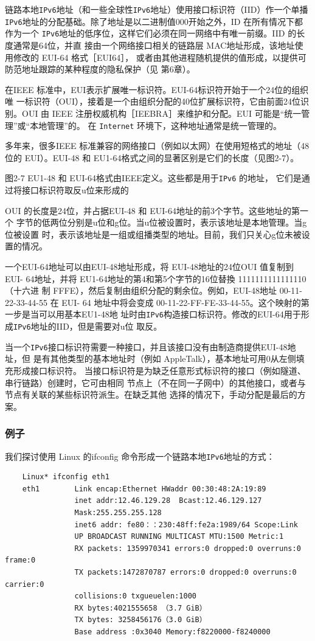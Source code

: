 链路本地\verb|IPv6|地址（和一些全球性\verb|IPv6|地址）使用接口标识符（IID）作一个单播
\verb|IPv6|地址的分配基础。除了地址是以二进制值000开始之外，ID 在所有情况下都作为一个
\verb|IPv6|地址的低序位，这样它们必须在同一网络中有唯一前缀。IID 的长度通常是64位，并直
接由一个网络接口相关的链路层 MAC地址形成，该地址使用修改的 EUI-64 格式［EUI64］，
或者由其他进程随机提供的值形成，以提供可防范地址跟踪的某种程度的隐私保护（见
第6章）。

在IEEE 标准中，EUI表示扩展唯一标识符。EUI-64标识符开始于一个24位的组织唯
一标识符（OUI），接着是一个由组织分配的40位扩展标识符，它由前面24位识别。OUI 由
IEEE 注册权威机构［IEEBRA］来维护和分配。EUI 可能是“统一管理”或“本地管理”的。
在 \verb|Internet| 环境下，这种地址通常是统一管理的。

多年来，很多IEEE 标准兼容的网络接口（例如以太网）在使用短格式的地址（48位的
EUI）。EUI-48 和 EU1-64格式之间的显著区别是它们的长度（见图2-7）。

图2-7 EU1-48 和 EUI-64格式由IEEE定义。这些都是用于\verb|IPv6| 的地址，
它们是通过将接口标识符取反u位来形成的

OUI 的长度是24位，并占据EUI-48 和 EUI-64地址的前3个字节。这些地址的第一个
字节的低两位分别是u位和g位。当u位被设置时，表示该地址是本地管理。当g位被设置
时，表示该地址是一组或组播类型的地址。目前，我们只关心g位未被设置的情况。

一个EUI-64地址可以由EUI-48地址形成，将 EUI-48地址的24位OUI 值复制到 EUI-
64地址，并将 EU1-64地址的第4和第5个字节的16位替換 1111111111111110（十六进
制 FFFE），然后复制由组织分配的剩余位。例如，EUI-48地址 00-11-22-33-44-55 在 EUI-
64 地址中将会变成 00-11-22-FF-FE-33-44-55。这个映射的第一步是当可以用基本EU1-48地
址时由\verb|IPv6|构造接口标识符。修改的EUI-64用于形成\verb|IPv6|地址的IID，但是需要对u位
取反。

当一个\verb|IPv6|接口标识符需要一种接口，并且该接口没有由制造商提供EUI-48地址，但
是有其他类型的基本地址时（例如 AppleTalk），基本地址可用0从左侧填充形成接口标识符。
当接口标识符是为缺乏任意形式标识符的接口（例如隧道、串行链路）创建时，它可由相同
节点上（不在同一子网中）的其他接口，或者与节点有关联的某些标识符派生。在缺乏其他
选择的情况下，手动分配是最后的方案。

\subsubsection{例子}
我们探讨使用 Linux 的ifconfig 命令形成一个链路本地\verb|IPv6|地址的方式：

\begin{verbatim}
    Linux* ifconfig eth1
    eth1        Link encap:Ethernet HWaddr 00:30:48:2A:19:89
                inet addr:12.46.129.28  Bcast:12.46.129.127
                Mask:255.255.255.128
                inet6 addr: fe80：：230:48ff:fe2a:1989/64 Scope:Link
                UP BROADCAST RUNNING MULTICAST MTU:1500 Metric:1
                RX packets: 1359970341 errors:0 dropped:0 overruns:0 frame:0
                TX packets:1472870787 errors:0 dropped:0 overruns:0 carrier:0
                collisions:0 txgueuelen:1000
                RX bytes:4021555658 （3.7 GiB）
                TX bytes: 3258456176（3.0 GiB）
                Base address :0x3040 Memory:f8220000-f8240000
\end{verbatim}

